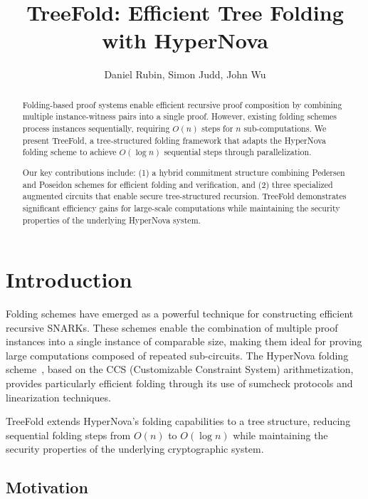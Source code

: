\documentclass[11pt,a4paper]{article}
\title{TreeFold: Efficient Tree Folding with HyperNova}
\author{Daniel Rubin, Simon Judd, John Wu}
\date{}
\theoremstyle{plain}
\theoremstyle{definition}
\begin{document}
\maketitle

\begin{abstract}
Folding-based proof systems enable efficient recursive proof composition by combining multiple instance-witness pairs into a single proof. However, existing folding schemes process instances sequentially, requiring $O(n)$ steps for $n$ sub-computations. We present TreeFold, a tree-structured folding framework that adapts the HyperNova folding scheme to achieve $O(\log n)$ sequential steps through parallelization.

Our key contributions include: (1) a hybrid commitment structure combining Pedersen and Poseidon schemes for efficient folding and verification, and (2) three specialized augmented circuits that enable secure tree-structured recursion. TreeFold demonstrates significant efficiency gains for large-scale computations while maintaining the security properties of the underlying HyperNova system.
\end{abstract}

\tableofcontents
\newpage

\section{Introduction}

Folding schemes have emerged as a powerful technique for constructing efficient recursive SNARKs. These schemes enable the combination of multiple proof instances into a single instance of comparable size, making them ideal for proving large computations composed of repeated sub-circuits. The HyperNova folding scheme~\cite{hypernova}, based on the CCS (Customizable Constraint System) arithmetization, provides particularly efficient folding through its use of sumcheck protocols and linearization techniques.

\begin{keypoint}
TreeFold extends HyperNova's folding capabilities to a tree structure, reducing sequential folding steps from $O(n)$ to $O(\log n)$ while maintaining the security properties of the underlying cryptographic system.
\end{keypoint}

\subsection{Motivation}
\end{document}
